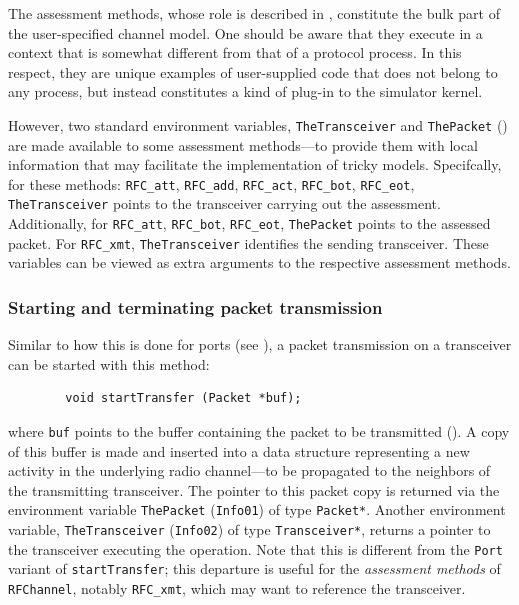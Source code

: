 The assessment methods, whose role is described in ,
constitute the bulk part of the user-specified channel model.
One should be aware that they execute in a context that is somewhat
different from that of a protocol process.
In this respect,
they are unique examples of user-supplied code that does not belong to any
process, but instead constitutes a kind of plug-in to the simulator kernel.

However, two standard environment variables, {\tt TheTransceiver} and
{\tt ThePacket} () are made available to some
assessment methods---to provide them with local information that may
facilitate the implementation of tricky models.
Specifcally, for these methods:
{\tt RFC\_att},
{\tt RFC\_add},
{\tt RFC\_act},
{\tt RFC\_bot},
{\tt RFC\_eot},
{\tt TheTransceiver} points to the transceiver carrying out the
assessment.
Additionally, for 
{\tt RFC\_att},
{\tt RFC\_bot},
{\tt RFC\_eot},
{\tt ThePacket} points to the assessed packet.
For {\tt RFC\_xmt}, {\tt TheTransceiver} identifies the sending transceiver.
These variables can be viewed as extra arguments to the respective
assessment methods.

\subsubsection{Starting and terminating packet transmission}
\label{rm_tr_ac_st}

Similar to how this is done for ports (see ),
a packet transmission on a transceiver can be started with this 
method:
\begin{verbatim}
        void startTransfer (Packet *buf);
\end{verbatim}
where {\tt buf} points to the buffer
containing the packet to be transmitted ().
A copy of this buffer is made and inserted into a data structure representing
a new activity in the underlying radio channel---to be propagated to the
neighbors of the transmitting transceiver.
The pointer to this packet copy is returned via the environment
variable {\tt ThePacket} ({\tt Info01}) of type {\tt Packet*}.
Another environment variable, {\tt TheTransceiver} ({\tt Info02}) of type
{\tt Transceiver*}, returns a pointer to the transceiver executing the
operation.
Note that this is different from the {\tt Port} variant of {\tt startTransfer};
this departure is useful for the {\em assessment methods\/} of
{\tt RFChannel}, notably {\tt RFC\_xmt}, which may want to reference the
transceiver.

